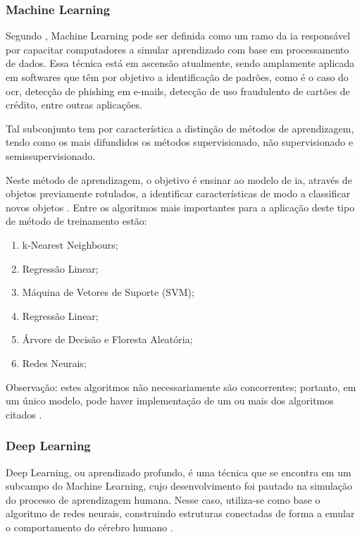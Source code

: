 \subsubsection{Machine Learning}

Segundo , Machine Learning pode ser 
definida como um ramo da \gls{ia} responsável por capacitar computadores
a simular aprendizado com base em processamento de dados. 
Essa técnica está em ascensão atualmente, sendo amplamente aplicada em softwares que 
têm por objetivo a identificação de padrões, como é o caso do \gls{ocr},
detecção de phishing em e-mails, detecção de uso fraudulento de cartões de crédito, 
entre outras aplicações.

Tal subconjunto tem por característica a distinção de métodos de aprendizagem, 
tendo como os mais difundidos os métodos supervisionado, 
não supervisionado e semissupervisionado.


Neste método de aprendizagem, o objetivo é ensinar ao modelo de \gls{ia}, 
através de objetos previamente rotulados, a identificar características de modo a 
classificar novos objetos \cite{SilvaVilela2021}. 
Entre os algoritmos mais importantes para a aplicação deste tipo de 
método de treinamento estão:

\begin{enumerate}
	\item k-Nearest Neighbours;
    \item Regressão Linear;
    \item Máquina de Vetores de Suporte (SVM);
    \item Regressão Linear;
    \item Árvore de Decisão e Floresta Aleatória;
    \item Redes Neurais;
\end{enumerate}

Observação: estes algoritmos não necessariamente são concorrentes; 
portanto, em um único modelo, pode haver implementação de um ou mais 
dos algoritmos citados \cite{SilvaVilela2021}.

\subsubsection{Deep Learning}

Deep Learning, ou aprendizado profundo, é uma técnica que se encontra 
em um subcampo do Machine Learning, cujo desenvolvimento foi pautado 
na simulação do processo de aprendizagem humana. 
Nesse caso, utiliza-se como base o algoritmo de redes neurais, 
construindo estruturas conectadas de forma a emular o comportamento do cérebro humano 
\cite{jesus2023inteligencia}.


